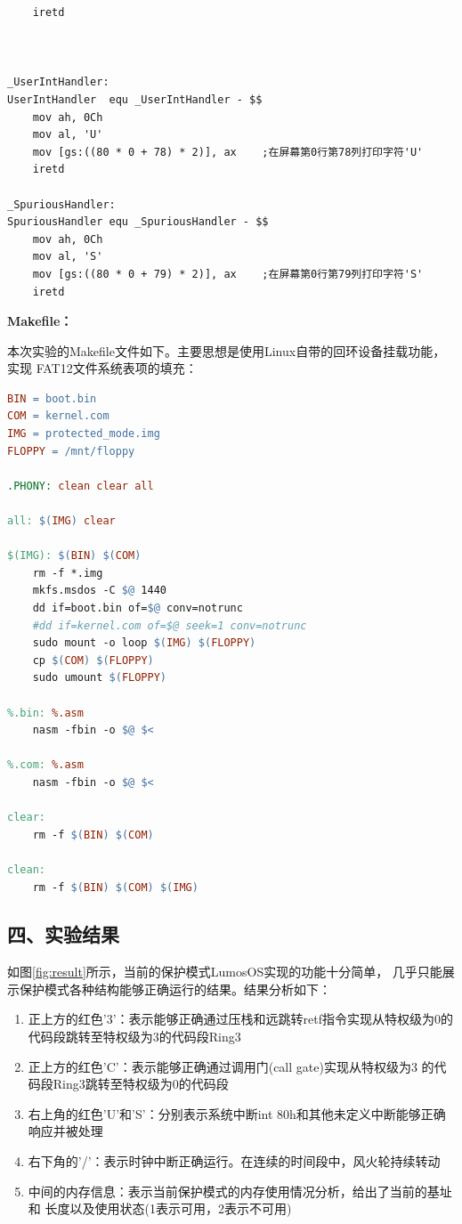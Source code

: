 \documentclass[12pt,a4paper,UTF8]{ctexart}
\begin{document}
\begin{lstlisting}
    iretd



_UserIntHandler:
UserIntHandler  equ _UserIntHandler - $$
    mov ah, 0Ch
    mov al, 'U'
    mov [gs:((80 * 0 + 78) * 2)], ax    ;在屏幕第0行第78列打印字符'U'
    iretd

_SpuriousHandler:
SpuriousHandler equ _SpuriousHandler - $$
    mov ah, 0Ch
    mov al, 'S'
    mov [gs:((80 * 0 + 79) * 2)], ax    ;在屏幕第0行第79列打印字符'S'
    iretd
\end{lstlisting}

\textbf{Makefile：}

本次实验的Makefile文件如下。主要思想是使用Linux自带的回环设备挂载功能，实现
FAT12文件系统表项的填充：

\begin{lstlisting}[language=make]
BIN = boot.bin
COM = kernel.com
IMG = protected_mode.img
FLOPPY = /mnt/floppy

.PHONY: clean clear all

all: $(IMG) clear

$(IMG): $(BIN) $(COM)
	rm -f *.img
	mkfs.msdos -C $@ 1440
	dd if=boot.bin of=$@ conv=notrunc
	#dd if=kernel.com of=$@ seek=1 conv=notrunc
	sudo mount -o loop $(IMG) $(FLOPPY)
	cp $(COM) $(FLOPPY)
	sudo umount $(FLOPPY)

%.bin: %.asm
	nasm -fbin -o $@ $<

%.com: %.asm
	nasm -fbin -o $@ $<

clear:
	rm -f $(BIN) $(COM)

clean:
	rm -f $(BIN) $(COM) $(IMG)
\end{lstlisting}

\subsection*{四、实验结果}

如图\ref{fig:result}所示，当前的保护模式LumosOS实现的功能十分简单，
几乎只能展示保护模式各种结构能够正确运行的结果。结果分析如下：

\begin{enumerate}
\item 正上方的红色'3'：表示能够正确通过压栈和远跳转retf指令实现从特权级为0的
代码段跳转至特权级为3的代码段Ring3
\item 正上方的红色'C'：表示能够正确通过调用门(call gate)实现从特权级为3
的代码段Ring3跳转至特权级为0的代码段
\item 右上角的红色'U'和'S'：分别表示系统中断int 80h和其他未定义中断能够正确
响应并被处理
\item 右下角的'/'：表示时钟中断正确运行。在连续的时间段中，风火轮持续转动
\item 中间的内存信息：表示当前保护模式的内存使用情况分析，给出了当前的基址和
长度以及使用状态(1表示可用，2表示不可用)
\end{enumerate}
\end{document}
